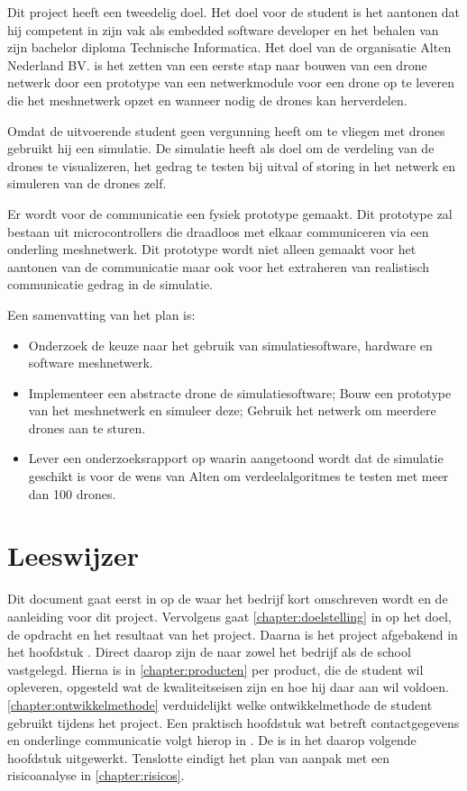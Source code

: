 \documentclass[a4paper, 11pt, oneside]{report}
\begin{document}
Dit project heeft een tweedelig doel.
Het doel voor de student is het aantonen dat hij competent in zijn vak als embedded software developer en het behalen van zijn bachelor diploma Technische Informatica.
Het doel van de organisatie Alten Nederland BV. is het zetten van een eerste stap naar bouwen van een drone netwerk door een prototype van een netwerkmodule voor een drone op te leveren die het meshnetwerk opzet en wanneer nodig de drones kan herverdelen.

Omdat de uitvoerende student geen vergunning heeft om te vliegen met drones gebruikt hij een simulatie.
De simulatie heeft als doel om de verdeling van de drones te visualizeren, het gedrag te testen bij uitval of storing in het netwerk en simuleren van de drones zelf.

Er wordt voor de communicatie een fysiek prototype gemaakt.
Dit prototype zal bestaan uit microcontrollers die draadloos met elkaar communiceren via een onderling meshnetwerk. 
Dit prototype wordt niet alleen gemaakt voor het aantonen van de communicatie maar ook voor het extraheren van realistisch communicatie gedrag in de simulatie.

Een samenvatting van het plan is:

\begin{itemize}
	\item Onderzoek de keuze naar het gebruik van simulatiesoftware, hardware en software meshnetwerk.
	\item Implementeer een abstracte drone de simulatiesoftware; Bouw een prototype van het meshnetwerk en simuleer deze; Gebruik het netwerk om meerdere drones aan te sturen.
	\item Lever een onderzoeksrapport op waarin aangetoond wordt dat de simulatie geschikt is voor de wens van Alten om verdeelalgoritmes te testen met meer dan 100 drones.
\end{itemize}

\section{Leeswijzer}

Dit document gaat eerst in op de  waar het bedrijf kort omschreven wordt en de aanleiding voor dit project.
Vervolgens gaat \autoref{chapter:doelstelling} in op het doel, de opdracht en het resultaat van het project.
Daarna is het project afgebakend in het hoofdstuk .
Direct daarop zijn de  naar zowel het bedrijf als de school vastgelegd.
Hierna is in \autoref{chapter:producten} per product, die de student wil opleveren, opgesteld wat de kwaliteitseisen zijn en hoe hij daar aan wil voldoen.
\autoref{chapter:ontwikkelmethode} verduidelijkt welke ontwikkelmethode de student gebruikt tijdens het project.
Een praktisch hoofdstuk wat betreft contactgegevens en onderlinge communicatie volgt hierop in .
De  is in het daarop volgende hoofdstuk uitgewerkt.
Tenslotte eindigt het plan van aanpak met een risicoanalyse in \autoref{chapter:risicos}.
\end{document}
